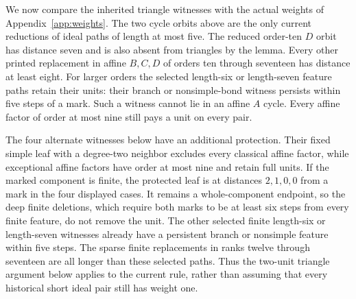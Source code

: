 \documentclass[11pt]{article}
\theoremstyle{remark}\newtheorem{remark}[theorem]{Remark}
\begin{document}
We now compare the inherited triangle witnesses with the actual weights
of Appendix~\ref{app:weights}. The two cycle orbits above are the only
current reductions of ideal paths of length at most five. The reduced
order-ten $D$ orbit has distance seven and is also absent from
triangles by the lemma. Every other printed replacement in affine
$B,C,D$ of orders ten through seventeen has distance at least eight.
For larger orders the selected length-six or length-seven feature
paths retain their units: their branch or nonsimple-bond witness
persists within five steps of a mark. Such a witness cannot lie in
an affine $A$ cycle. Every affine factor of order at most nine still
pays a unit on every pair.

The four alternate witnesses below have an additional protection.
Their fixed simple leaf with a degree-two neighbor excludes every
classical affine factor, while exceptional affine factors have order
at most nine and retain full units. If the marked component is
finite, the protected leaf is at distances $2,1,0,0$ from a mark
in the four displayed cases. It remains a whole-component endpoint,
so the deep finite deletions, which require both marks to be at
least six steps from every finite feature, do not remove the unit.
The other selected finite length-six or length-seven witnesses
already have a persistent branch or nonsimple feature within five
steps. The sparse finite replacements in ranks twelve through
seventeen are all longer than these selected paths. Thus the
two-unit triangle argument below applies to the current rule,
rather than assuming that every historical short ideal pair
still has weight one.
\end{document}

